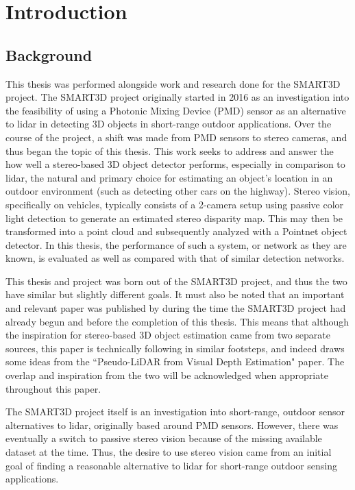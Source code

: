 \section{Introduction} %

\subsection{Background}
This thesis was performed alongside work and research done for the SMART3D project. The SMART3D project originally started in 2016 as an investigation into the feasibility of using a Photonic Mixing Device (PMD) sensor as an alternative to lidar in detecting 3D objects in short-range outdoor applications. Over the course of the project, a shift was made from PMD sensors to stereo cameras, and thus began the topic of this thesis. This work seeks to address and answer the how well a stereo-based 3D object detector performs, especially in comparison to lidar, the natural and primary choice for estimating an object's location in an outdoor environment (such as detecting other cars on the highway). Stereo vision, specifically on vehicles, typically consists of a 2-camera setup using passive color light detection to generate an estimated stereo disparity map. This may then be transformed into a point cloud and subsequently analyzed with a Pointnet object detector. In this thesis, the performance of such a system, or network as they are known, is evaluated as well as compared with that of similar detection networks. 

This thesis and project was born out of the SMART3D project, and thus the two have similar but slightly different goals. It must also be noted that an important and relevant paper was published by \cite{wang_pseudo-lidar_2019} during the time the SMART3D project had already begun and before the completion of this thesis. This means that although the inspiration for stereo-based 3D object estimation came from two separate sources, this paper is technically following in similar footsteps, and indeed draws some ideas from the ``Pseudo-LiDAR from Visual Depth Estimation" paper. The overlap and inspiration from the two will be acknowledged when appropriate throughout this paper.

The SMART3D project itself is an investigation into short-range, outdoor sensor alternatives to lidar, originally based around PMD sensors. However, there was eventually a switch to passive stereo vision because of the missing available dataset at the time. Thus, the desire to use stereo vision came from an initial goal of finding a reasonable alternative to lidar for short-range outdoor sensing applications.

